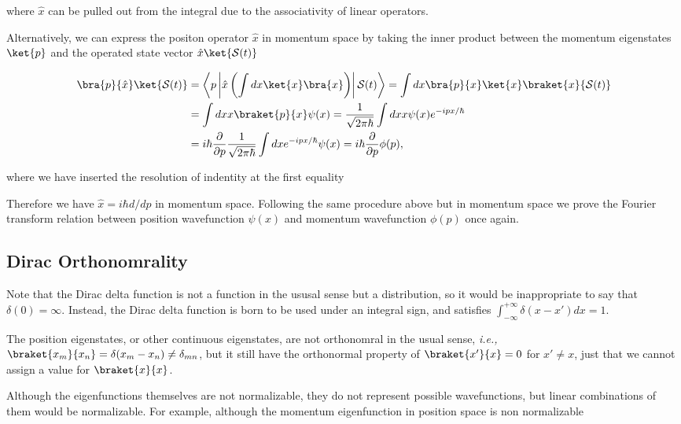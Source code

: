 \documentclass[a4paper,12pt]{report}
\begin{document}
where \(\hat{x} \) can be pulled out from the integral due to the associativity of linear operators.

Alternatively, we can express the positon operator \(\hat{x} \) in momentum space by taking the inner product between the momentum eigenstates \(\ket{p} \) and the operated state vector \(\hat{x} \ket{\mathcal{S}(t)} \)

\begin{equation}
  \begin{aligned} 
  \bra{p}{\hat{x} }\ket{\mathcal{S}(t)} &= \left \langle p\left| \hat{x}   \left(\int dx \ket{x} \bra{x} \right) \right| \mathcal{S}(t) \right \rangle = \int dx \bra{p}{x}\ket{x} \braket{x}{\mathcal{S}(t)}  \\
  &= \int dx x \braket{p}{x} \psi (x) = \frac{1}{\sqrt{2\pi \hbar } }  \int dx x \psi (x) e^{-ipx /\hbar } \\
  &= i \hbar \frac{\partial }{\partial p} \frac{1}{\sqrt{2\pi \hbar } } \int dx e^{-ipx /\hbar }\psi (x) = i \hbar \frac{\partial }{\partial p} \phi (p), 
  \end{aligned} 
\end{equation}

where we have inserted the resolution of indentity at the first equality

Therefore we have \(\hat{x} = i \hbar d /dp \) in momentum space. Following the same procedure above but in momentum space we prove the Fourier transform relation between position wavefunction \(\psi (x)\) and momentum wavefunction \(\phi (p)\) once again.  

\subsection{Dirac Orthonomrality}

Note that the Dirac delta function is not a function in the ususal sense but a distribution, so it would be inappropriate to say that \(\delta (0) = \infty\). Instead, the Dirac delta function is born to be used under an integral sign, and satisfies \(\int_{-\infty}^{+\infty} \delta (x-x')dx = 1 \).

The position eigenstates, or other continuous eigenstates, are not orthonomral in the usual sense, \textit{i.e.,} \(\braket{x_{m} }{x_{n} } = \delta (x_{m} - x_{n}  ) \neq  \delta _{mn}  \), but it still have the orthonormal property of \(\braket{x'}{x} = 0 \) for \(x' \neq x\), just that we cannot assign a value for \(\braket{x}{x} \).

Although the eigenfunctions themselves are not normalizable, they do not represent possible wavefunctions, but linear combinations of them would be normalizable. For example, although the momentum eigenfunction in position space is non normalizable
\end{document}
